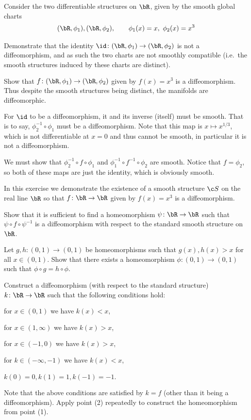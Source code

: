 \bprob[title={Do Carmo, Riemannian Geometry, page 33 problem 11}]

    Consider the two differentiable structures on $\bR$, given by the smooth global charts
    $$ (\bR,\phi_1),(\bR,\phi_2),\qquad \phi_1(x)=x,\ \phi_2(x)=x^3 $$
    \benum
        \item Demonstrate that the identity $\id\colon(\bR,\phi_1)\to(\bR,\phi_2)$ is not a diffeomorphism,
        and as such the two charts are not smoothly compatible (i.e.\ the smooth structures induced by
        these charts are distinct).
        \item Show that $f\colon(\bR,\phi_1)\to(\bR,\phi_2)$ given by $f(x)=x^3$ is a diffeomorphism.
        Thus despite the smooth structures being distinct, the manifolds are diffeomorphic.
    \eenum

\eprob

\benum
    \item For $\id$ to be a diffeomorphism, it and its inverse (itself) must be smooth.
    That is to say, $\phi_2^{-1}\circ\phi_1$ must be a diffeomorphism.
    Note that this map is $x\mapsto x^{1/3}$, which is not differentiable at $x=0$ and thus cannot be smooth,
    in particular it is not a diffeomorphism.

    \item We must show that $\phi_2^{-1}\circ f\circ\phi_1$ and $\phi_1^{-1}\circ f^{-1}\circ\phi_2$ are
    smooth.
    Notice that $f=\phi_2$, so both of these maps are just the identity, which is obviously smooth.
\eenum

\bprob

    In this exercise we demonstrate the existence of a smooth structure $\c S$ on the real line $\bR$
    so that $f\colon\bR\to\bR$ given by $f(x)=x^3$ is a diffeomorphism.
    \benum
        \item Show that it is sufficient to find a homeomorphism $\psi\colon\bR\to\bR$ such that
        $\psi\circ f\circ\psi^{-1}$ is a diffeomorphism with respect to the standard smooth structure on $\bR$.
        \item Let $g,h\colon(0,1)\to(0,1)$ be homeomorphisms such that $g(x),h(x)>x$ for all $x\in(0,1)$.
        Show that there exists a homeomorphism $\phi\colon(0,1)\to(0,1)$ such that $\phi\circ g=h\circ\phi$.
        \item Construct a diffeomorphism (with respect to the standard structure) $k\colon\bR\to\bR$ such
        that the following conditions hold:
        \benum
            \item for $x\in(0,1)$ we have $k(x)<x$,
            \item for $x\in(1,\infty)$ we have $k(x)>x$,
            \item for $x\in(-1,0)$ we have $k(x)>x$,
            \item for $k\in(-\infty,-1)$ we have $k(x)<x$,
            \item $k(0)=0,k(1)=1,k(-1)=-1$.
        \eenum
        \item Note that the above conditions are satisfied by $k=f$ (other than it being a diffeomorphism).
        Apply point (2) repeatedly to construct the homeomorphism from point (1).
    \eenum

